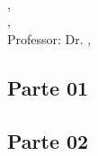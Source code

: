 \documentclass[a4paper, 11pt, answers]{exam}
\title{\titulo}
\author{\nomeAutorUm e \nomeAutorDois}
\date{\today}
\makeatletter
\newcommand{\printtitle}{
  \begin{center}
    {\Large \scshape \titulo}\\[1em]
    {\nomeAutorUm, \raAutorUm}\\
    {\nomeAutorDois, \raAutorDois}\\[1em]
    Professor: Dr\@. \nomeProfessor, \centroProfessor\\
    {\itshape \campusFaculdade}
  \end{center}
}
\makeatother
\begin{document}
  \printtitle

  \begin{questions}
    \section*{Parte 01}
    
  \end{questions}
  \pagebreak
  \begin{questions}
    \section*{Parte 02}
    
  \end{questions}
\end{document}
